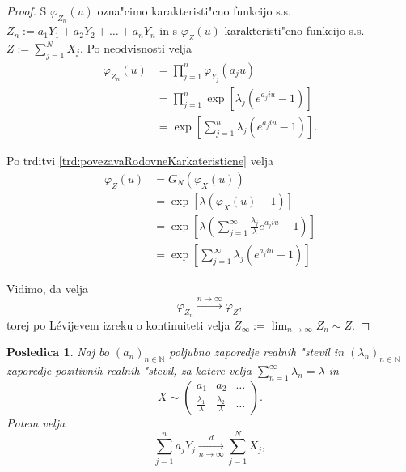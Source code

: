 \documentclass[12pt, a4paper, reqno]{amsart}
\theoremstyle{definition} %
\theoremstyle{plain} %
\newtheorem{posledica}[definicija]{Posledica}
\newcommand{\N}{\mathbb{N}}
\newcommand{\1}{\mathds{1}}
\begin{document}
    \begin{proof}
        S $\varphi_{Z_n}(u)$ ozna"cimo karakteristi"cno funkcijo s.s.\ 
        $Z_n := a_1Y_1 + a_2Y_2 + \dots + a_nY_n$ in s $\varphi_{Z}(u)$ karakteristi"cno funkcijo s.s.\
        $Z:= \sum_{j=1}^{N}X_j$. Po neodvisnosti velja
        \begin{align*}
            \varphi_{Z_n}(u) 
                    &= \prod_{j=1}^{n}\varphi_{Y_j}(a_ju)\\
                    &= \prod_{j=1}^{n}\exp\left[\lambda_j\left(e^{a_j i u} - 1\right)\right] \\
                    &= \exp\left[\sum_{j=1}^{n}\lambda_j\left(e^{a_j i u} - 1\right)\right].
        \end{align*}

        \noindent
        Po trditvi \ref{trd:povezavaRodovneKarkateristicne} velja
        \begin{align*}
            \varphi_{Z}(u) 
                    &= G_N\left(\varphi_X(u)\right) \\
                    &= \exp\left[\lambda\left(\varphi_X(u) - 1\right)\right] \\
                    & = \exp\left[\lambda\left(\sum_{j=1}^\infty\frac{\lambda_j}{\lambda}e^{a_jiu} - 1\right)\right]\\
                    &= \exp\left[\sum_{j=1}^{\infty}\lambda_j\left(e^{a_j i u} - 1\right)\right]
        \end{align*}

        \noindent 
        Vidimo, da velja%
        \begin{equation*}
            \varphi_{Z_n} \xrightarrow{n\to\infty}\varphi_Z,
        \end{equation*}
        torej po Lévijevem izreku o kontinuiteti velja $Z_\infty :=\lim_{n\to\infty}Z_n \sim Z$.
    \end{proof}

    \begin{posledica}
        Naj bo $(a_n)_{n\in\N}$ poljubno zaporedje realnih "stevil in $(\lambda_n)_{n\in\N}$ zaporedje 
        pozitivnih realnih "stevil, za katere velja $\sum_{n=1}^\infty\lambda_n = \lambda$ in 
        \begin{equation*}
            X\sim
            \begin{pmatrix}
                a_1 & a_2 &  \dots \\
                \tfrac{\lambda_1}{\lambda} & \tfrac{\lambda_2}{\lambda} & \dots
            \end{pmatrix}.
        \end{equation*}
        Potem velja
        \begin{equation*}
            \sum_{j=1}^{n}a_jY_j \xrightarrow[n\to\infty]{d}\sum_{j=1}^NX_j,
        \end{equation*}
        \label{pos:NXjeEnakoaYstevno}
    \end{posledica}
\end{document}
